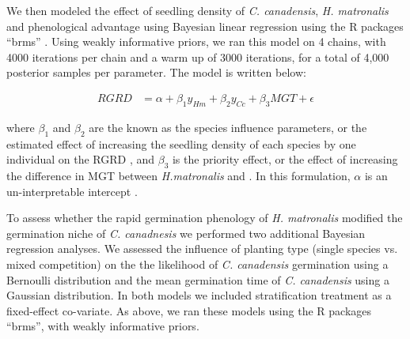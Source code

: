 \documentclass{article}[11pt]
\begin{document}
We then modeled the effect of seedling density of \textit{C. canadensis}, \textit{H. matronalis} and phenological advantage using Bayesian linear regression  using the R packages ``brms'' \citep{Burkner2018}. Using weakly informative priors, we ran this model on 4 chains, with 4000 iterations per chain and a warm up of 3000 iterations, for a total of 4,000 posterior samples per parameter. The model is written below:

\begin{align*}

RGRD &= \alpha + \beta_{1}y_{Hm} + \beta_{2}y_{Cc} + \beta_{3}MGT + \epsilon

\end{align*}

where  $\beta_{1}$ and $\beta_{2}$ are the known as the species influence parameters, or the estimated effect of increasing the seedling density of each species by one individual on the RGRD \citep{Connolly2005}, and $\beta_{3}$ is the priority effect, or the effect of increasing the difference in MGT between  \textit{H.matronalis} and . In this formulation, $\alpha$ is an un-interpretable intercept \citep{Connolly2005}.


To assess whether the rapid germination phenology of \textit{H. matronalis} modified the germination niche of \textit{C. canadnesis} we performed two additional Bayesian  regression analyses. We assessed the influence of planting type (single species vs. mixed competition) on the the likelihood of \textit{C. canadensis} germination using a Bernoulli distribution and the mean germination time of \textit{C. canadensis} using a Gaussian distribution. In both models we included stratification treatment as a fixed-effect co-variate. As above, we ran these models using the R packages ``brms''\citep{Burkner2018},  with weakly informative priors.
\end{document}
